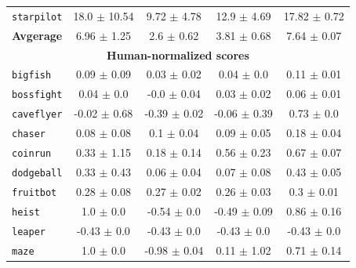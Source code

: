 \begin{table}[h]
\begin{tabular}{@{} l c c c c@{}}
    \texttt{starpilot}  &                 18.0 $\pm$ 10.54 &                   9.72 $\pm$ 4.78 &                   12.9 $\pm$ 4.69 &           17.82 $\pm$ 0.72 \\
    \textbf{Avgerage} &                  6.96 $\pm$ 1.25 &                    2.6 $\pm$ 0.62 &                   3.81 $\pm$ 0.68 &            7.64 $\pm$ 0.07 \\
    \midrule
    \multicolumn{5}{c}{\textbf{Human-normalized scores}} \\ 
    \texttt{bigfish}             &                  0.09 $\pm$ 0.09 &                   0.03 $\pm$ 0.02 &                    0.04 $\pm$ 0.0 &            0.11 $\pm$ 0.01 \\
    \texttt{bossfight}           &                   0.04 $\pm$ 0.0 &                   -0.0 $\pm$ 0.04 &                   0.03 $\pm$ 0.02 &            0.06 $\pm$ 0.01 \\
    \texttt{caveflyer}           &                 -0.02 $\pm$ 0.68 &                  -0.39 $\pm$ 0.02 &                  -0.06 $\pm$ 0.39 &             0.73 $\pm$ 0.0 \\
    \texttt{chaser}              &                  0.08 $\pm$ 0.08 &                    0.1 $\pm$ 0.04 &                   0.09 $\pm$ 0.05 &            0.18 $\pm$ 0.04 \\
    \texttt{coinrun}             &                  0.33 $\pm$ 1.15 &                   0.18 $\pm$ 0.14 &                   0.56 $\pm$ 0.23 &            0.67 $\pm$ 0.07 \\
    \texttt{dodgeball}           &                  0.33 $\pm$ 0.43 &                   0.06 $\pm$ 0.04 &                   0.07 $\pm$ 0.08 &            0.43 $\pm$ 0.05 \\
    \texttt{fruitbot}            &                  0.28 $\pm$ 0.08 &                   0.27 $\pm$ 0.02 &                   0.26 $\pm$ 0.03 &             0.3 $\pm$ 0.01 \\
    \texttt{heist}               &                    1.0 $\pm$ 0.0 &                   -0.54 $\pm$ 0.0 &                  -0.49 $\pm$ 0.09 &            0.86 $\pm$ 0.16 \\
    \texttt{leaper}              &                  -0.43 $\pm$ 0.0 &                   -0.43 $\pm$ 0.0 &                   -0.43 $\pm$ 0.0 &            -0.43 $\pm$ 0.0 \\
    \texttt{maze}                &                    1.0 $\pm$ 0.0 &                  -0.98 $\pm$ 0.04 &                   0.11 $\pm$ 1.02 &            0.71 $\pm$ 0.14 \\

\end{tabular}
\end{table}
